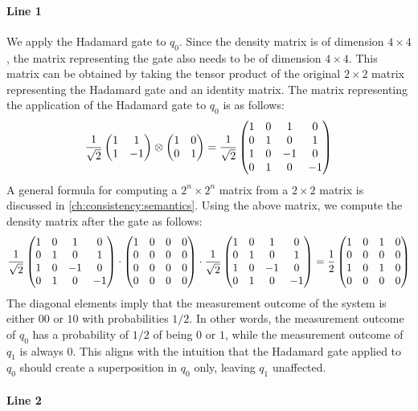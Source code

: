 \paragraph{Line 1}

We apply the Hadamard gate to $q_0$.
%
Since the density matrix is of dimension $4\times4$, the matrix representing
the gate also needs to be of dimension $4\times4$.
%
This matrix can be obtained by taking the tensor product of the original
$2\times2$ matrix representing the Hadamard gate and an identity matrix.
%
The matrix representing the application of the Hadamard gate to $q_0$ is as
follows:
%
\[
	\frac{1}{\sqrt{2}}\begin{pmatrix}1&1\\1&-1\end{pmatrix}\otimes\begin{pmatrix}1&0\\0&1\end{pmatrix}
	=\frac{1}{\sqrt{2}}\begin{pmatrix}1&0&1&0\\0&1&0&1\\1&0&-1&0\\0&1&0&-1\end{pmatrix}
\]
%
A general formula for computing a $2^n\times2^n$ matrix from a $2\times2$
matrix is discussed in \cref{ch:consistency:semantics}.
%
Using the above matrix, we compute the density matrix after the gate as
follows:
%
\[
	\frac{1}{\sqrt{2}}\begin{pmatrix}1&0&1&0\\0&1&0&1\\1&0&-1&0\\0&1&0&-1\end{pmatrix}
	\cdot
	\begin{pmatrix}1&0&0&0\\0&0&0&0\\0&0&0&0\\0&0&0&0\end{pmatrix}
	\cdot
	\frac{1}{\sqrt{2}}\begin{pmatrix}1&0&1&0\\0&1&0&1\\1&0&-1&0\\0&1&0&-1\end{pmatrix}
	= \frac{1}{2}\begin{pmatrix}1&0&1&0\\0&0&0&0\\1&0&1&0\\0&0&0&0\end{pmatrix}
\]
%
The diagonal elements imply that the measurement outcome of the system is
either $00$ or $10$ with probabilities $1/2$.
%
In other words, the measurement outcome of $q_0$ has a probability of $1/2$ of
being $0$ or $1$, while the measurement outcome of $q_1$ is always $0$.
%
This aligns with the intuition that the Hadamard gate applied to $q_0$ should
create a superposition in $q_0$ only, leaving $q_1$ unaffected.

\paragraph{Line 2}

